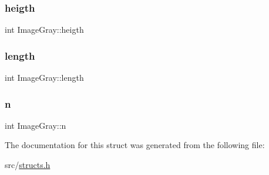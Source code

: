 \subsubsection{\texorpdfstring{heigth}{heigth}}
{\footnotesize\ttfamily int Image\+Gray\+::heigth}

\mbox{\label{structImageGray_a8b7307978071511731a34a2a011efddd}} 
\subsubsection{\texorpdfstring{length}{length}}
{\footnotesize\ttfamily int Image\+Gray\+::length}

\mbox{\label{structImageGray_a2191428ee36edaee985387a6f25f0643}} 
\subsubsection{\texorpdfstring{n}{n}}
{\footnotesize\ttfamily int Image\+Gray\+::n}



The documentation for this struct was generated from the following file\+:\begin{DoxyCompactItemize}
\item 
src/\hyperlink{structs_8h}{structs.\+h}\end{DoxyCompactItemize}
